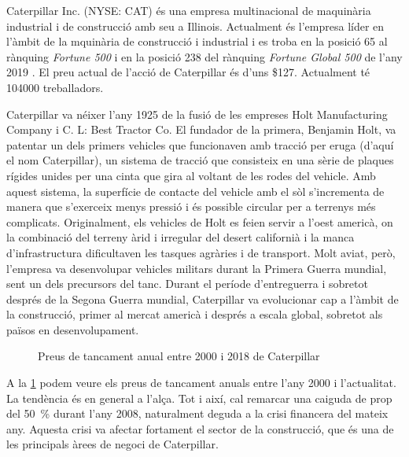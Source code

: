 \documentclass{article}
\numberwithin{table}{section}
\numberwithin{figure}{section}
\numberwithin{equation}{section}
\begin{document}
Caterpillar Inc. (NYSE: CAT) és una empresa multinacional de maquinària industrial i de construcció amb seu a Illinois. Actualment és l'empresa líder en l'àmbit de la mquinària de construcció i industrial \cite{cat} i es troba en la posició 65 al rànquing \emph{Fortune 500} i en la posició 238 del rànquing \emph{Fortune Global 500} de l'any 2019 \cite{fortune,global}. El preu actual de l'acció de Caterpillar és d'uns \$127. Actualment té \num{104000} treballadors. 

Caterpillar va néixer l'any 1925 de la fusió de les empreses Holt Manufacturing Company i C. L: Best Tractor Co. El fundador de la primera, Benjamin Holt, va patentar un dels primers vehicles que funcionaven amb tracció per eruga (d'aquí el nom Caterpillar), un sistema de tracció que consisteix en una sèrie de plaques rígides unides per una cinta que gira al voltant de les rodes del vehicle. Amb aquest sistema, la superfície de contacte del vehicle amb el sòl s'incrementa de manera que s'exerceix menys pressió i és possible circular per a terrenys més complicats. Originalment, els vehicles de Holt es feien servir a l'oest americà, on la combinació del terreny àrid i irregular del desert californià i la manca d'infrastructura dificultaven les tasques agràries i de transport. Molt aviat, però, l'empresa va desenvolupar vehicles militars durant la Primera Guerra mundial, sent un dels precursors del tanc. Durant el període d'entreguerra i sobretot després de la Segona Guerra mundial, Caterpillar va evolucionar cap a l'àmbit de la construcció, primer al mercat americà i després a escala global, sobretot als països en desenvolupament. 

\begin{figure}[htb]
	\centering \sffamily \small
	
	\caption{Preus de tancament anual entre 2000 i 2018 de Caterpillar}
	\label{fig:tancament}
\end{figure}

A la \cref{fig:tancament} podem veure els preus de tancament anuals entre l'any 2000 i l'actualitat. La tendència és en general a l'alça. Tot i així, cal remarcar una caiguda de prop del \SI{50}{\percent} durant l'any 2008, naturalment deguda a la crisi financera del mateix any. Aquesta crisi va afectar fortament el sector de la construcció, que és una de les principals àrees de negoci de Caterpillar.
\end{document}
